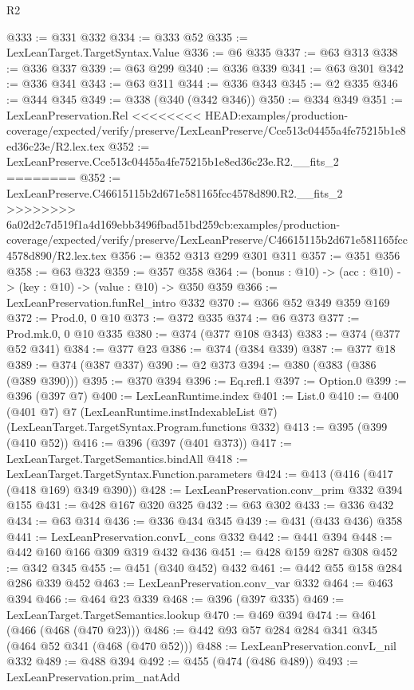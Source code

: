 \begin{lexlean}{R2}
\begin{coremodule}
{{{{{{{{{{{{{{{{{{{{{{@333 := @331 @332
@334 := @333 @52
@335 := LexLeanTarget.TargetSyntax.Value
@336 := @6 @335
@337 := @63 @313
@338 := @336 @337
@339 := @63 @299
@340 := @336 @339
@341 := @63 @301
@342 := @336 @341
@343 := @63 @311
@344 := @336 @343
@345 := @2 @335
@346 := @344 @345
@349 := @338 (@340 (@342 @346))
@350 := @334 @349
@351 := LexLeanPreservation.Rel
<<<<<<<< HEAD:examples/production-coverage/expected/verify/preserve/LexLeanPreserve/Cce513c04455a4fe75215b1e8ed36c23e/R2.lex.tex
@352 := LexLeanPreserve.Cce513c04455a4fe75215b1e8ed36c23e.R2.__fits_2
========
@352 := LexLeanPreserve.C46615115b2d671e581165fcc4578d890.R2.__fits_2
>>>>>>>> 6a02d2c7d519f1a4d169ebb3496fbad51bd259cb:examples/production-coverage/expected/verify/preserve/LexLeanPreserve/C46615115b2d671e581165fcc4578d890/R2.lex.tex
@356 := @352 @313 @299 @301 @311
@357 := @351 @356
@358 := @63 @323
@359 := @357 @358
@364 := (bonus : @10) -> (acc : @10) -> (key : @10) -> (value : @10) -> @350 @359
@366 := LexLeanPreservation.funRel_intro @332
@370 := @366 @52 @349 @359 @169
@372 := Prod.{0, 0} @10
@373 := @372 @335
@374 := @6 @373
@377 := Prod.mk.{0, 0} @10 @335
@380 := @374 (@377 @108 @343)
@383 := @374 (@377 @52 @341)
@384 := @377 @23
@386 := @374 (@384 @339)
@387 := @377 @18
@389 := @374 (@387 @337)
@390 := @2 @373
@394 := @380 (@383 (@386 (@389 @390)))
@395 := @370 @394
@396 := Eq.refl.{1}
@397 := Option.{0}
@399 := @396 (@397 @7)
@400 := LexLeanRuntime.index
@401 := List.{0}
@410 := @400
    (@401 @7)
    @7
    (LexLeanRuntime.instIndexableList @7)
    (LexLeanTarget.TargetSyntax.Program.functions @332)
@413 := @395 (@399 (@410 @52))
@416 := @396 (@397 (@401 @373))
@417 := LexLeanTarget.TargetSemantics.bindAll
@418 := LexLeanTarget.TargetSyntax.Function.parameters
@424 := @413 (@416 (@417 (@418 @169) @349 @390))
@428 := LexLeanPreservation.conv_prim @332 @394 @155
@431 := @428 @167 @320 @325
@432 := @63 @302
@433 := @336 @432
@434 := @63 @314
@436 := @336 @434 @345
@439 := @431 (@433 @436) @358
@441 := LexLeanPreservation.convL_cons @332
@442 := @441 @394
@448 := @442 @160 @166 @309 @319 @432 @436
@451 := @428 @159 @287 @308
@452 := @342 @345
@455 := @451 (@340 @452) @432
@461 := @442 @55 @158 @284 @286 @339 @452
@463 := LexLeanPreservation.conv_var @332
@464 := @463 @394
@466 := @464 @23 @339
@468 := @396 (@397 @335)
@469 := LexLeanTarget.TargetSemantics.lookup
@470 := @469 @394
@474 := @461 (@466 (@468 (@470 @23)))
@486 := @442 @93 @57 @284 @284 @341 @345 (@464 @52 @341 (@468 (@470 @52)))
@488 := LexLeanPreservation.convL_nil @332
@489 := @488 @394
@492 := @455 (@474 (@486 @489))
@493 := LexLeanPreservation.prim_natAdd
}}}}}}}}}}}}}}}}}}}}}}
\end{coremodule}
\end{lexlean}
